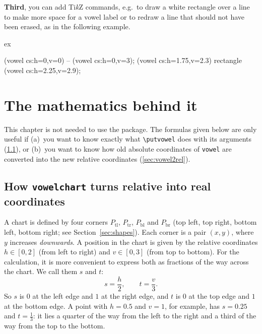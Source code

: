 \documentclass[a4paper,11pt]{article}
\newcommand\cmd[1]{\texttt{\textbackslash #1}}
\newcommand\pkg[1]{\texttt{#1}}
\begin{document}
\noindent
\textbf{Third}, you can add Ti\textit{k}Z commands, e.g.\ to draw a white rectangle over a line to make more space for a vowel label or to redraw a line that should not have been erased, as in the following example.

\begin{tcblisting}{ex}
\begin{vowelchart}[slanted]
  \draw[line width=\vowelchartline] (vowel cs:h=0,v=0) -- (vowel cs:h=0,v=3);
  \fill[vowelchartbg] (vowel cs:h=1.75,v=2.3) rectangle (vowel cs:h=2.25,v=2.9);
\end{vowelchart}
\end{tcblisting}





\section{The mathematics behind it}\label{sec:math}

This chapter is not needed to use the package. The formulas given below are only useful if (a)~you want to know exactly what \cmd{putvowel} does with its arguments (\ref{sec:rel2real}), or (b)~you want to know how old absolute coordinates of \pkg{vowel} are converted into the new relative coordinates (\ref{sec:vowel2rel}).

 

\subsection{How \pkg{vowelchart} turns relative into real coordinates}
\label{sec:rel2real}

A chart is defined by four corners $P_\mathrm{tl}$, $P_\mathrm{tr}$, $P_\mathrm{bl}$ and $P_\mathrm{br}$ (top left, top right, bottom left, bottom right; see Section~\ref{sec:shapes}). Each corner is a pair $(x,y)$, where $y$ increases \emph{downwards}.
A position in the chart is given by the relative coordinates $h\in[0,2]$ (from left to right) and $v\in[0,3]$ (from top to bottom). For the calculation, it is more convenient to express both as fractions of the way across the chart. We call them $s$ and $t$:
\[
s=\frac h2,\qquad t=\frac v3 .
\]
So $s$ is $0$ at the left edge and $1$ at the right edge, and $t$ is $0$ at the top edge and $1$ at the bottom edge. A point with $h=0.5$ and $v=1$, for example, has $s=0.25$ and $t=\frac13$: it lies a quarter of the way from the left to the right and a third of the way from the top to the bottom.
\end{document}
